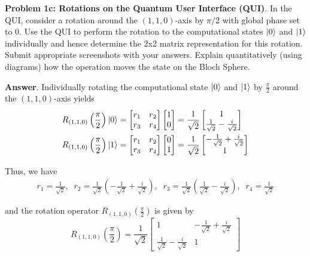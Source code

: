 \textbf{Problem 1c: Rotations on the Quantum User Interface (QUI)}. In the QUI, consider a rotation around the $(1,1,0)$-axis by $\pi/2$ with global phase set to $0$. 
Use the QUI to perform the rotation to the computational states $\ket{0}$ and $\ket{1}$ individually and hence determine the 2x2 matrix representation for this rotation. 
Submit appropriate screenshots with your answers. 
Explain quantitatively (using diagrams) how the operation moves the state on the Bloch Sphere.


\textbf{Answer}. Individually rotating the computational state $\ket{0}$ and $\ket{1}$ by $\frac{\pi}{2}$ around the $(1,1,0)$-axis yields
\begin{align*}
	R_{(1,1,0)}\left(\frac{\pi}{2}\right)
	\ket{0}
	&=
	\begin{bmatrix}
		r_1 & r_2 \\ 
		r_3 & r_4
	\end{bmatrix} 
	\begin{bmatrix}
		1 \\ 
		0
	\end{bmatrix} 
	=
	\frac{1}{\sqrt{2}}
	\begin{bmatrix}
		1 \\
		\frac{1}{\sqrt{2}} - \frac{i}{\sqrt{2}}
	\end{bmatrix} \\
	R_{(1,1,0)}\left(\frac{\pi}{2}\right)
	\ket{1}
	&=
	\begin{bmatrix}
		r_1 & r_2 \\ 
		r_3 & r_4
	\end{bmatrix} 
	\begin{bmatrix}
		0 \\ 
		1
	\end{bmatrix} 
	=
	\frac{1}{\sqrt{2}}
	\begin{bmatrix}
		-\frac{1}{\sqrt{2}} + \frac{i}{\sqrt{2}} \\
		1
	\end{bmatrix} 
\end{align*}

Thus, we have
\begin{align*}
	r_1 = \frac{1}{\sqrt{2}},\;\;
	r_2 = \frac{1}{\sqrt{2}}(-\frac{1}{\sqrt{2}} + \frac{i}{\sqrt{2}}),\;\;
	r_3 = \frac{1}{\sqrt{2}}(\frac{1}{\sqrt{2}} - \frac{i}{\sqrt{2}}),\;\;
	r_4 = \frac{1}{\sqrt{2}}
\end{align*}

and the rotation operator $R_{(1,1,0)}\left(\frac{\pi}{2}\right)$ is given by
\begin{equation*}
	R_{(1,1,0)}\left(\frac{\pi}{2}\right) = 
	\frac{1}{\sqrt{2}}
	\begin{bmatrix}
		1	&	 -\frac{1}{\sqrt{2}} + \frac{i}{\sqrt{2}} \\
		\frac{1}{\sqrt{2}} - \frac{i}{\sqrt{2}}	&	1
	\end{bmatrix}
\end{equation*}

